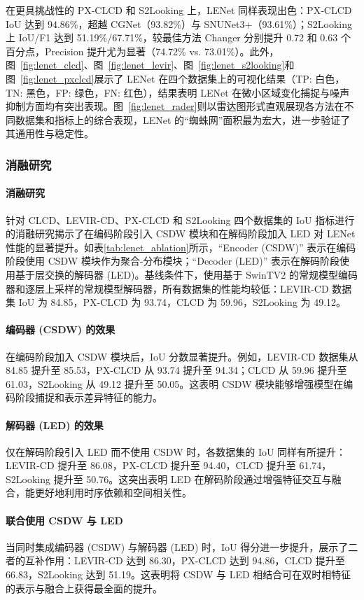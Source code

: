 在更具挑战性的 PX‐CLCD 和 S2Looking 上，LENet 同样表现出色：PX‐CLCD IoU 达到 94.86\%，超越 CGNet（93.82\%）与 SNUNet3+（93.61\%）；S2Looking 上 IoU/F1 达到 51.19\%/67.71\%，较最佳方法 Changer 分别提升 0.72 和 0.63 个百分点，Precision 提升尤为显著（74.72\% vs. 73.01\%）。此外，图~\ref{fig:lenet_clcd}、图~\ref{fig:lenet_levir}、图~\ref{fig:lenet_s2looking}和图~\ref{fig:lenet_pxclcd}展示了 LENet 在四个数据集上的可视化结果（TP: 白色，TN: 黑色，FP: 绿色，FN: 红色），结果表明 LENet 在微小区域变化捕捉与噪声抑制方面均有突出表现。图~\ref{fig:lenet_rader}则以雷达图形式直观展现各方法在不同数据集和指标上的综合表现，LENet 的“蜘蛛网”面积最为宏大，进一步验证了其通用性与稳定性。

\subsubsection{消融研究}
\paragraph{消融研究}
针对 CLCD、LEVIR-CD、PX-CLCD 和 S2Looking 四个数据集的 IoU 指标进行的消融研究揭示了在编码阶段引入 CSDW 模块和在解码阶段加入 LED 对 LENet 性能的显著提升。如表\ref{tab:lenet_ablation}所示，“Encoder (CSDW)” 表示在编码阶段使用 CSDW 模块作为聚合-分布模块；“Decoder (LED)” 表示在解码阶段使用基于层交换的解码器 (LED)。基线条件下，使用基于 SwinTV2 的常规模型编码器和逐层上采样的常规模型解码器，所有数据集的性能均较低：LEVIR-CD 数据集 IoU 为 84.85，PX-CLCD 为 93.74，CLCD 为 59.96，S2Looking 为 49.12。

\paragraph{编码器 (CSDW) 的效果}
在编码阶段加入 CSDW 模块后，IoU 分数显著提升。例如，LEVIR-CD 数据集从 84.85 提升至 85.53，PX-CLCD 从 93.74 提升至 94.34；CLCD 从 59.96 提升至 61.03，S2Looking 从 49.12 提升至 50.05。这表明 CSDW 模块能够增强模型在编码阶段捕捉和表示差异特征的能力。

\paragraph{解码器 (LED) 的效果}
仅在解码阶段引入 LED 而不使用 CSDW 时，各数据集的 IoU 同样有所提升：LEVIR-CD 提升至 86.08，PX-CLCD 提升至 94.40，CLCD 提升至 61.74，S2Looking 提升至 50.76。这突出表明 LED 在解码阶段通过增强特征交互与融合，能更好地利用时序依赖和空间相关性。

\paragraph{联合使用 CSDW 与 LED}
当同时集成编码器 (CSDW) 与解码器 (LED) 时，IoU 得分进一步提升，展示了二者的互补作用：LEVIR-CD 达到 86.30，PX-CLCD 达到 94.86，CLCD 提升至 66.83，S2Looking 达到 51.19。这表明将 CSDW 与 LED 相结合可在双时相特征的表示与融合上获得最全面的提升。


